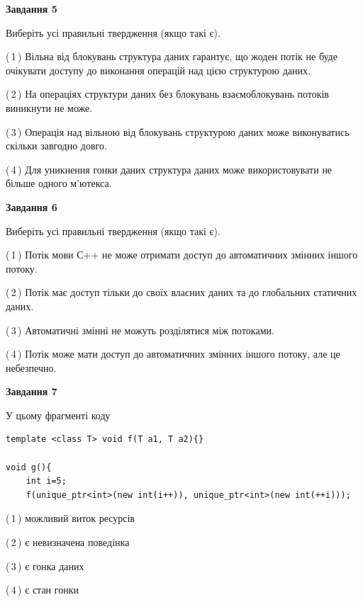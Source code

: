 \documentclass[12pt, ukrainian]{article}
\begin{document}
\begin {large}
{\begin{center}
\textbf{Завдання 5}
\end{center}

Виберіть усі правильні твердження (якщо такі є).\par
\vspace{2mm}

(\,1\,) Вільна від блокувань структура даних гарантує, що жоден потік не буде очікувати доступу до виконання операцій над цією структурою даних.%

(\,2\,) На операціях структури даних без блокувань взаємоблокувань потоків виникнути не може.%

(\,3\,) Операція над вільною від блокувань структурою даних може виконуватись скільки завгодно довго.%

(\,4\,) Для уникнення гонки даних структура даних може використовувати не більше одного м’ютекса.%
\newpage


\begin{center}
\textbf{Завдання 6}
\end{center}

Виберіть усі правильні твердження (якщо такі є).\par
\vspace{2mm}

(\,1\,) Потік мови С++ не може отримати доступ до автоматичних змінних іншого потоку.%

(\,2\,) Потік має доступ тільки до своїх власних даних та до глобальних статичних даних.%

(\,3\,) Автоматичні змінні не можуть розділятися між потоками.%

(\,4\,) Потік може мати доступ до автоматичних змінних іншого потоку, але це небезпечно.%


\begin{center}
\textbf{Завдання 7}
\end{center}

У цьому фрагменті коду
\begin{verbatim}
template <class T> void f(T a1, T a2){}

void g(){
    int i=5;
    f(unique_ptr<int>(new int(i++)), unique_ptr<int>(new int(++i)));
\end{verbatim}

(\,1\,) можливий виток ресурсів%

(\,2\,) є невизначена поведінка%

(\,3\,) є гонка даних%

(\,4\,) є стан гонки%

}
\end {large}

\vspace{4mm}
\newpage
\end{document}
